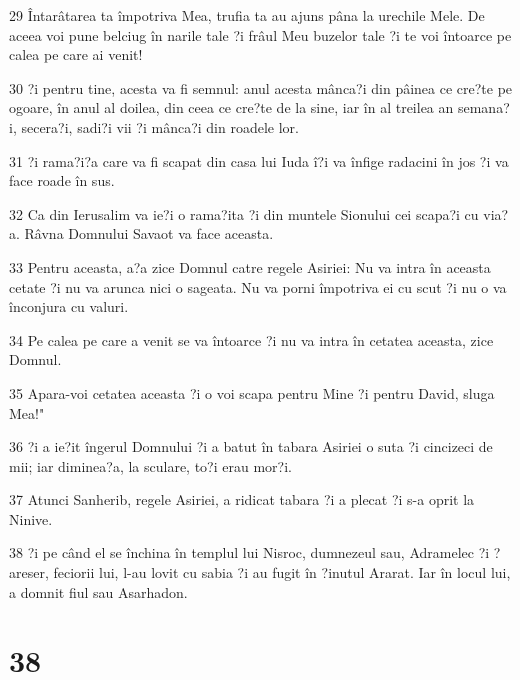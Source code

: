 \par 29 Întarâtarea ta împotriva Mea, trufia ta au ajuns pâna la urechile Mele. De aceea voi pune belciug în narile tale ?i frâul Meu buzelor tale ?i te voi întoarce pe calea pe care ai venit!
\par 30 ?i pentru tine, acesta va fi semnul: anul acesta mânca?i din pâinea ce cre?te pe ogoare, în anul al doilea, din ceea ce cre?te de la sine, iar în al treilea an semana?i, secera?i, sadi?i vii ?i mânca?i din roadele lor.
\par 31 ?i rama?i?a care va fi scapat din casa lui Iuda î?i va înfige radacini în jos ?i va face roade în sus.
\par 32 Ca din Ierusalim va ie?i o rama?ita ?i din muntele Sionului cei scapa?i cu via?a. Râvna Domnului Savaot va face aceasta.
\par 33 Pentru aceasta, a?a zice Domnul catre regele Asiriei: Nu va intra în aceasta cetate ?i nu va arunca nici o sageata. Nu va porni împotriva ei cu scut ?i nu o va înconjura cu valuri.
\par 34 Pe calea pe care a venit se va întoarce ?i nu va intra în cetatea aceasta, zice Domnul.
\par 35 Apara-voi cetatea aceasta ?i o voi scapa pentru Mine ?i pentru David, sluga Mea!"
\par 36 ?i a ie?it îngerul Domnului ?i a batut în tabara Asiriei o suta ?i cincizeci de mii; iar diminea?a, la sculare, to?i erau mor?i.
\par 37 Atunci Sanherib, regele Asiriei, a ridicat tabara ?i a plecat ?i s-a oprit la Ninive.
\par 38 ?i pe când el se închina în templul lui Nisroc, dumnezeul sau, Adramelec ?i ?areser, feciorii lui, l-au lovit cu sabia ?i au fugit în ?inutul Ararat. Iar în locul lui, a domnit fiul sau Asarhadon.

\chapter{38}

